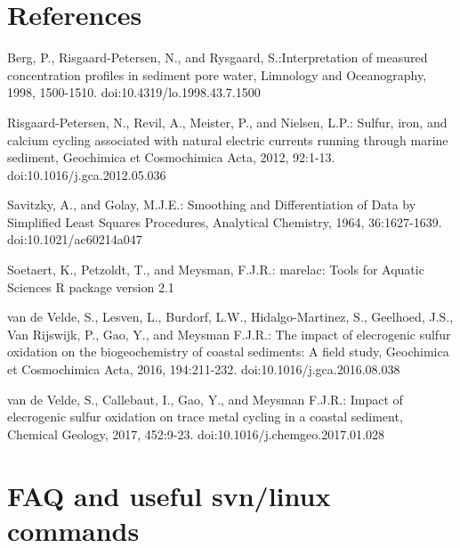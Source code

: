 \documentclass[10pt]{article}
\begin{document}
\section{References}
\begin{thebibliography}{}
	
Berg, P., Risgaard-Petersen, N., and Rysgaard, S.:Interpretation of measured concentration profiles in sediment pore water, Limnology and Oceanography, 1998, 1500-1510. doi:10.4319/lo.1998.43.7.1500
	
Risgaard-Petersen, N., Revil, A., Meister, P., and Nielsen, L.P.: Sulfur, iron, and calcium cycling associated with natural electric currents running through marine sediment, Geochimica et Cosmochimica Acta, 2012, 92:1-13. doi:10.1016/j.gca.2012.05.036

Savitzky, A., and Golay, M.J.E.: Smoothing and Differentiation of Data by Simplified Least Squares Procedures, Analytical Chemistry, 1964, 36:1627-1639. doi:10.1021/ac60214a047

Soetaert, K., Petzoldt, T., and Meysman, F.J.R.: marelac: Tools for Aquatic Sciences R package version 2.1

van de Velde, S., Lesven, L., Burdorf, L.W., Hidalgo-Martinez, S., Geelhoed, J.S., Van Rijswijk, P., Gao, Y., and Meysman F.J.R.: The impact of elecrogenic sulfur oxidation on the biogeochemistry of coastal sediments: A field study, Geochimica et Cosmochimica Acta, 2016, 194:211-232. doi:10.1016/j.gca.2016.08.038

van de Velde, S., Callebaut, I., Gao, Y., and Meysman F.J.R.: Impact of elecrogenic sulfur oxidation on trace metal cycling in a coastal sediment, Chemical Geology, 2017, 452:9-23. doi:10.1016/j.chemgeo.2017.01.028
		
\end{thebibliography}

\section{FAQ and useful svn/linux commands}
\end{document}

